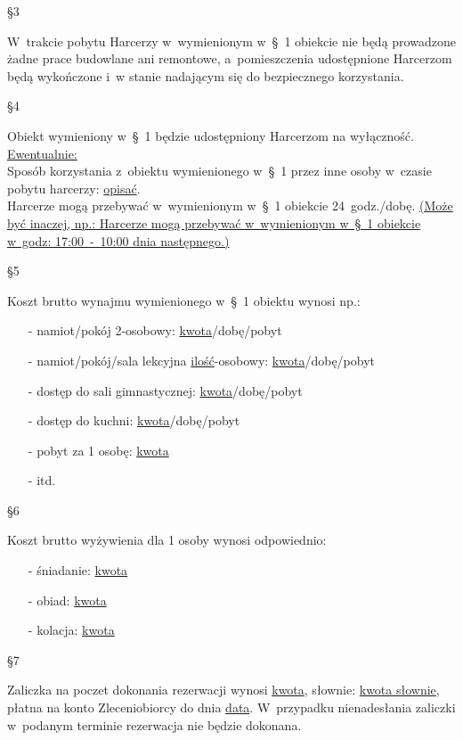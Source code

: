 \begin{center}\S 3\end{center}
W~trakcie pobytu Harcerzy w~wymienionym w~\S~1 obiekcie nie będą prowadzone żadne prace budowlane ani remontowe, a~pomieszczenia udostępnione Harcerzom będą wykończone i~w stanie nadającym się do bezpiecznego korzystania.

\begin{center}\S 4\end{center}
Obiekt wymieniony w~\S~1 będzie udostępniony Harcerzom na wyłączność.\\
\uline{Ewentualnie:}\\
Sposób korzystania z~obiektu wymienionego w~\S~1 przez inne osoby w~czasie pobytu harcerzy: \uline{opisać}.\\
Harcerze mogą przebywać w~wymienionym w~\S~1 obiekcie 24~godz./dobę. \uline{(Może być inaczej, np.: Harcerze mogą przebywać w~wymienionym w~\S~1 obiekcie w~godz: 17:00~-~10:00 dnia następnego.)}

\begin{center}\S 5\end{center}
Koszt brutto wynajmu wymienionego w~\S~1 obiektu wynosi np.:
\begin{itemize}
\item[-] namiot/pokój 2-osobowy: \uline{kwota}/dobę/pobyt
\item[-] namiot/pokój/sala lekcyjna \uline{ilość}-osobowy: \uline{kwota}/dobę/pobyt
\item[-] dostęp do sali gimnastycznej: \uline{kwota}/dobę/pobyt
\item[-] dostęp do kuchni: \uline{kwota}/dobę/pobyt
\item[-] pobyt za 1 osobę: \uline{kwota}
\item[-] itd.
\end{itemize}
\newpage
\begin{center}\S 6\end{center}
Koszt brutto wyżywienia dla 1 osoby wynosi odpowiednio:
\begin{itemize}
\item[-] śniadanie: \uline{kwota}
\item[-] obiad: \uline{kwota}
\item[-] kolacja: \uline{kwota}
\end{itemize}

\begin{center}\S 7\end{center}
Zaliczka na poczet dokonania rezerwacji wynosi \uline{kwota}, słownie: \uline{kwota słownie}, płatna na konto Zleceniobiorcy do dnia \uline{data}. W~przypadku nienadesłania zaliczki w~podanym terminie rezerwacja nie będzie dokonana.

